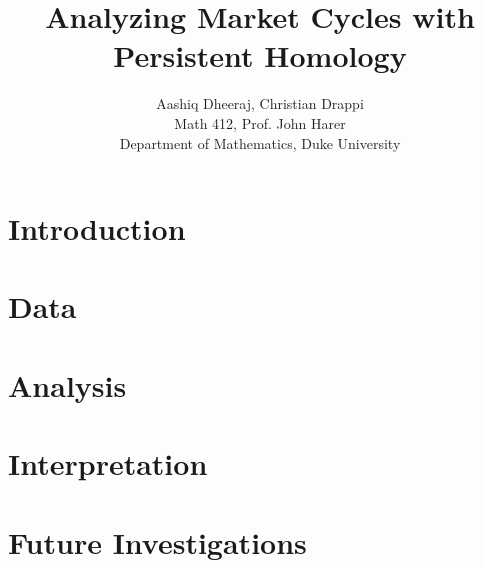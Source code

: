 \documentclass{article} %
\title{Analyzing Market Cycles with Persistent Homology}
\author{
Aashiq Dheeraj, Christian Drappi \\
Math 412, Prof. John Harer \\
Department of Mathematics, Duke University
}
\begin{document}
\large

\maketitle

\begin{abstract}

\end{abstract}

\section{Introduction}

\section{Data}

\section{Analysis}

\section{Interpretation}

\section{Future Investigations}
\end{document}
